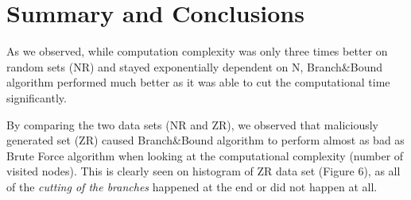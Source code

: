 \documentclass{article}
\begin{document}
\section{Summary and Conclusions}
As we observed, while computation complexity was only three times better on random sets (NR) and stayed exponentially dependent on N, Branch\&Bound algorithm performed much better as it was able to cut the computational time significantly.

By comparing the two data sets (NR and ZR), we observed that maliciously generated set (ZR) caused Branch\&Bound algorithm to perform almost as bad as Brute Force algorithm when looking at the computational complexity (number of visited nodes). This is clearly seen on histogram of ZR data set (Figure 6), as all of the \textit{cutting of the branches} happened at the end or did not happen at all. 

\printbibliography
\end{document}
